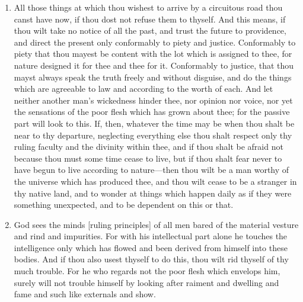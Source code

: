 \begin{enumerate}
\item All those things at which thou wishest to arrive by a circuitous road thou canst have now, if thou dost not refuse them to thyself. And this means, if thou wilt take no notice of all the past, and trust the future to providence, and direct the present only conformably to piety and justice. Conformably to piety that thou mayest be content with the lot which is assigned to thee, for nature designed it for thee and thee for it. Conformably to justice, that thou mayst always speak the truth freely and without disguise, and do the things which are agreeable to law and according to the worth of each. And let neither another man's wickedness hinder thee, nor opinion nor voice, nor yet the sensations of the poor flesh which has grown about thee; for the passive part will look to this. If, then, whatever the time may be when thou shalt be near to thy departure, neglecting everything else thou shalt respect only thy ruling faculty and the divinity within thee, and if thou shalt be afraid not because thou must some time cease to live, but if thou shalt fear never to have begun to live according to nature—then thou wilt be a man worthy of the universe which has produced thee, and thou wilt cease to be a stranger in thy native land, and to wonder at things which happen daily as if they were something unexpected, and to be dependent on this or that.

\item God sees the minds [{\clarify ruling principles}] of all men bared of the material vesture and rind and impurities. For with his intellectual part alone he touches the intelligence only which has flowed and been derived from himself into these bodies. And if thou also usest thyself to do this, thou wilt rid thyself of thy much trouble. For he who regards not the poor flesh which envelops him, surely will not trouble himself by looking after raiment and dwelling and fame and such like externals and show.


\end{enumerate}
